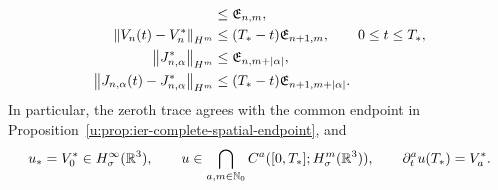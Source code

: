 \begin{theorem}
\begin{align}
 &\le\mathfrak E_{n,m},
 \label{u:eq:ier-endpoint-velocity-size}\\
 \left\lVert V_n(t)-V_n^*\right\rVert_{H^m}
 &\le(T_*-t)\mathfrak E_{n+1,m},
 \qquad0\le t\le T_*,
 \label{u:eq:ier-endpoint-velocity-modulus}\\
 \left\lVert J_{n,\alpha}^*\right\rVert_{H^m}
 &\le\mathfrak E_{n,m+|\alpha|},
 \label{u:eq:ier-endpoint-mixed-size}\\
 \left\lVert J_{n,\alpha}(t)-J_{n,\alpha}^*\right\rVert_{H^m}
 &\le(T_*-t)\mathfrak E_{n+1,m+|\alpha|}.
 \label{u:eq:ier-endpoint-mixed-modulus}
\end{align}
 In particular, the zeroth trace agrees with the common endpoint in
 Proposition~\ref{u:prop:ier-complete-spatial-endpoint}, and
\begin{equation}
 u_*=V_0^*\in H^\infty_\sigma(\mathbb R^3),
 \qquad
 u\in\bigcap_{a,m\in\mathbb N_0}C^a([0,T_*];H^m_\sigma(\mathbb R^3)),
 \qquad
 \partial_t^au(T_*)=V_a^*.
 \label{u:eq:ier-complete-left-velocity-jet}
\end{equation}
\end{theorem}

